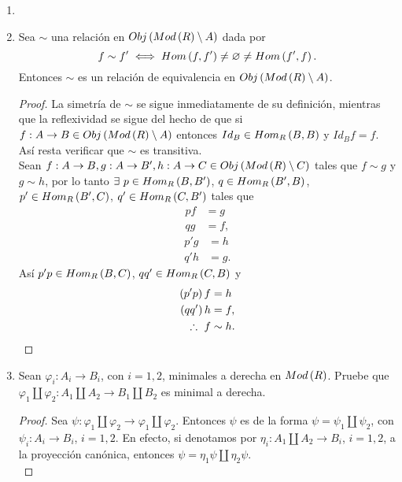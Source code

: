 \documentclass{article}
\begin{document}
\begin{enumerate}[label=\textbf{Ej \arabic*.}]
		\item
		\item Sea $\sim$ una relación en $Obj\left(Mod\left(R\right)\setminus A\right)$ dada por
		\begin{equation*}
			f\sim f'\iff Hom\left(f,f'\right)\neq\varnothing\neq Hom\left(f',f\right).
		\end{equation*}
		Entonces $\sim$ es un relación de equivalencia en $Obj\left(Mod\left(R\right)\setminus A\right)$.
		\begin{proof}
			La simetría de $\sim$ se sigue inmediatamente de su definición, mientras que la reflexividad se sigue del hecho de que si $f:A\to B\in Obj\left(Mod\left(R\right)\setminus A\right)$ entonces $Id_B\in Hom_{R}\left(B,B\right)$ y $Id_B f=f$. Así resta verificar que $\sim$ es transitiva.\\
				Sean $f:A\to B,g:A\to B', h:A\to C\in Obj\left(Mod\left(R\right)\setminus C\right)$ tales que $f\sim g$ y $g\sim h$, por lo tanto $\exists\ p\in\ringmodhom{R}{B}{B'}$, $q\in Hom_{R}\left(B',B\right)$, $p'\in Hom_{R}\left(B',C\right)$, $q'\in Hom_{R}\left(C,B'\right)$ tales que
			\begin{equation*}
				\begin{split}
					pf&=g\\
					qg&=f,
				\end{split}
			\end{equation*}
			\begin{equation*}
				\begin{split}
					p'g&=h\\
					q'h&=g.
				\end{split}
			\end{equation*}
			Así $p'p\in Hom_{R}\left(B,C\right)$, $qq'\in Hom_{R}\left(C,B\right)$ y
			\begin{equation*}
				\begin{split}
					\left(p'p\right)f&=h\\
					\left(qq'\right)h&=f,\\			
					\therefore\ f&\sim h.
				\end{split}
			\end{equation*}
		\end{proof}
		\item Sean $\varphi_{i}:A_{i} \longrightarrow B_{i}$, con $i=1,2$, minimales a derecha en $Mod\left(R\right)$. Pruebe que $\varphi_{1}\coprod\varphi_{2}:A_{1} \coprod A_{2} \longrightarrow B_{1} \coprod B_{2}$ es minimal a derecha.
		\begin{proof}
			Sea $\psi:\varphi_{1}\coprod\varphi_{2}\longrightarrow\varphi_{1}\coprod\varphi_{2}$. Entonces $\psi$ es de la forma $\psi = \psi_{1}\coprod\psi_{2}$, con $\psi_{i}:A_{i} \longrightarrow B_{i}$, $i=1,2$. En efecto, si denotamos por $\eta_{i}:A_{1} \coprod A_{2} \longrightarrow B_{i}$, $i=1,2$, a la proyección canónica, entonces $\psi = \eta_{1}\psi\coprod\eta_{2}\psi$.\\
			

\end{proof}
\end{enumerate}
\end{document}
